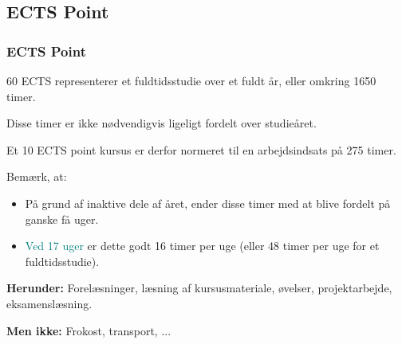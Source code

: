 \documentclass[t, aspectratio=169]{beamer}
\begin{document}
\subsection{ECTS Point}
\begin{frame}[fragile]
  \frametitle{ECTS Point}
  \vspace{1mm}
  60 ECTS representerer et fuldtidsstudie over et fuldt år, eller omkring 1650 timer.
  
  \vspace{3mm}
  Disse timer er ikke nødvendigvis ligeligt fordelt over studieåret.

  \vspace{3mm}
  Et 10 ECTS point kursus er derfor normeret til en arbejdsindsats på 275 timer.
  
  \pause
  \vspace{3mm}
  Bemærk, at:
  \begin{itemize}
    \item På grund af inaktive dele af året, ender disse timer med at blive fordelt på ganske få uger.
    \item \textcolor{teal}{Ved 17 uger} er dette godt 16 timer per uge (eller 48 timer per uge for et fuldtidsstudie).
  \end{itemize}
  
  \pause
  \vspace{3mm}
  \textbf{Herunder:} Forelæsninger, læsning af kursusmateriale, øvelser, projektarbejde,
  eksamenslæsning.
  
  \pause
  \vspace{3mm}
  \textbf{Men ikke:} Frokost, transport, ...
\end{frame}
\end{document}
